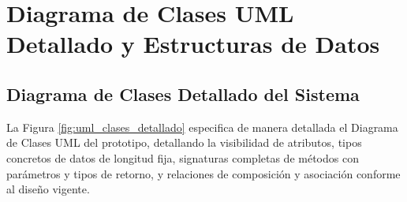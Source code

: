 \section{Diagrama de Clases UML Detallado y Estructuras de Datos}
\label{sec:diagrama_clases_detallado}

\subsection{Diagrama de Clases Detallado del Sistema}

La Figura \ref{fig:uml_clases_detallado} especifica de manera detallada el Diagrama de Clases UML del prototipo, detallando la visibilidad de atributos, tipos concretos de datos de longitud fija, signaturas completas de métodos con parámetros y tipos de retorno, y relaciones de composición y asociación conforme al diseño vigente.

